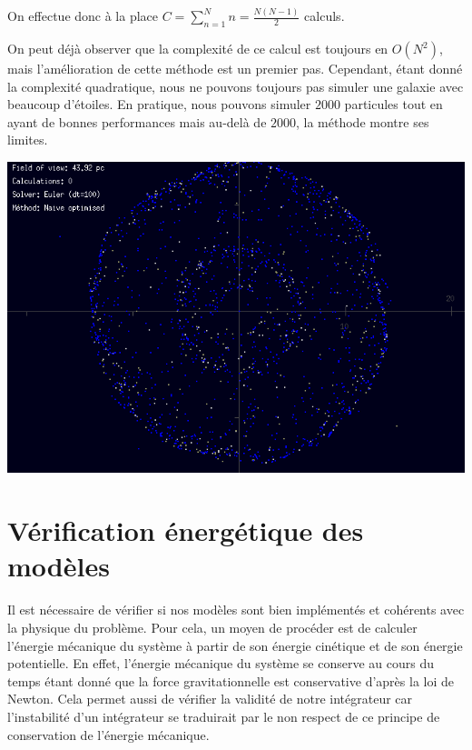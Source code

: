 \vspace{2mm}
On effectue donc à la place $C=\sum_{n=1}^N n = \frac{N(N-1)}{2}$ calculs.

\vspace{2mm}
On peut déjà observer que la complexité de ce calcul est toujours  en $O(N^2)$, mais l'amélioration de cette méthode est un premier pas. Cependant, étant donné la complexité quadratique, nous ne pouvons toujours pas simuler une galaxie avec beaucoup d'étoiles. En pratique, nous pouvons simuler $2000$ particules tout en ayant de bonnes performances mais au-delà de $2000$, la méthode montre ses limites.

\begin{center}
\includegraphics[scale=0.8]{images/NO.png}
\captionsetup{hypcap=false}
\label{fig3}
\end{center} 

\section{Vérification énergétique des modèles}

Il est nécessaire de vérifier si nos modèles sont bien implémentés et cohérents avec la physique du problème. Pour cela, un moyen de procéder est de calculer l'énergie mécanique du système à partir de son énergie cinétique et de son énergie potentielle. En effet, l'énergie mécanique du système se conserve au cours du temps étant donné que la force gravitationnelle est conservative d'après la loi de Newton.
Cela permet aussi de vérifier la validité de notre intégrateur car l'instabilité d'un intégrateur se traduirait par le non respect de ce principe de conservation de l'énergie mécanique.

